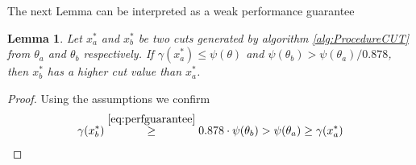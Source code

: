 \documentclass[12pt,a4paper]{article}
\theoremstyle{mythm}
\newtheorem{lem}[thm]{Lemma}
\begin{document}
The next Lemma can be interpreted as a weak performance guarantee
\begin{lem}
Let $ x ^{*} _{ a } $ and $ x ^{*} _{ b } $ be two cuts generated by algorithm \ref{alg:ProcedureCUT} from $ \theta_a $ and $ \theta_b $ respectively.
If $ \gamma ( x ^{ * } _{ a } ) \leq \psi ( \theta) $ and $ \psi ( \theta _{ b } ) > \psi ( \theta_a)/0.878 $, then $ x ^{ * } _{ b }  $ has a higher cut value than $ x ^{ * }
_{ a }  $.
\end{lem} 
\begin{proof}
Using the assumptions we confirm
\begin{align*}
\gamma ( x ^{ * } _{ b } ) \overset{ \ref{eq:perfguarantee}  }{ \geq  } 0.878 \cdot \psi ( \theta_b) > \psi ( \theta_a) \geq \gamma ( x ^{ * } _{ a } ) 
\end{align*} 
\end{proof}
\end{document}
